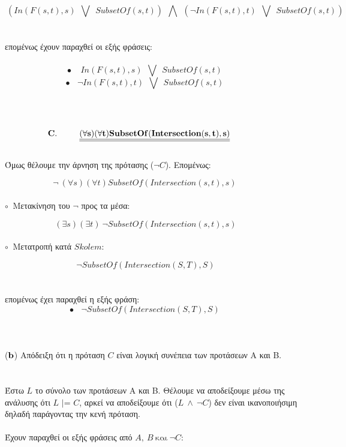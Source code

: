 \documentclass[10pt]{article}
\begin{document}
 \[ 
 \  \left(  In(F(s,t),s) \ \ \bigvee \ \  SubsetOf(s,t) \right ) \ \ \bigwedge  \  \  \left( \neg In(F(s,t),t) \ \ \bigvee \ \  SubsetOf(s,t) \right )
 \ \ \ \ \ \ \ \ \ \ \ \ \] \\ \\

επομένως έχουν παραχθεί οι εξής φράσεις: \\ \\

 \[  \bullet \ \ \ \
 \   In(F(s,t),s) \ \ \bigvee \ \  SubsetOf(s,t)
 \ \ \ \ \ \ \ \ \ \ \ \ \] 
 \[ \bullet \ \ \ \
  \neg In(F(s,t),t) \ \ \bigvee \ \  SubsetOf(s,t)  \ \ \ \ \ \ \ \ \ \ \ \
 \]
\\ \\ \\
\[ \bf C. \ \ \ \ \ \ \ \ \underline{\underline{
(\forall s)(\forall t)SubsetOf(Intersection(s,t),s)}}
 \ \ \ \ \ \ \ \ \ \ \ \ \] \\

 Όμως θέλουμε την άρνηση της πρότασης ($\neg C$). Επομένως:
 
\[ \neg \ 
(\forall s)(\forall t)SubsetOf(Intersection(s,t),s)
 \ \ \ \ \ \ \ \ \ \ \ \ \] \\

  
$\circ \ $ Μετακίνηση του $\neg$ προς τα μέσα:

\[  \ 
(\exists s)(\exists t)\ \neg 
 SubsetOf(Intersection(s,t),s)
 \ \ \ \ \ \ \ \ \ \ \ \ \] \\

 $\circ \ $ Μετατροπή κατά $Skolem$:

 \[  \  \neg 
 SubsetOf(Intersection(S,T),S)
 \ \ \ \ \ \ \ \ \ \ \ \ \] \\ \\

επομένως έχει παραχθεί η εξής φράση:  
 \[  \bullet \ \ \ \ \neg 
 SubsetOf(Intersection(S,T),S)
 \ \ \ \ \ \ \ \ \ \ \ \ \] \\ \\ \\
 ($\bf b$) \normalfont Απόδειξη ότι η πρόταση $C$ είναι λογική συνέπεια των προτάσεων Α και Β. \\ \\ \\
 Έστω $L$ το σύνολο των προτάσεων Α και Β. Θέλουμε να αποδείξουμε μέσω της ανάλυσης ότι $L$ $|$= $C$, αρκεί να αποδείξουμε ότι ($L\ \wedge  \ \neg C$) δεν είναι ικανοποιήσιμη δηλαδή παράγοντας την κενή πρόταση. \\ \\ 
 Έχουν παραχθεί οι εξής φράσεις από $A, \ B \ \text{και} \ \neg C$:\\ \\
\end{document}
